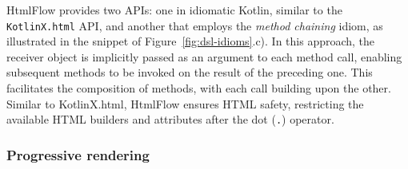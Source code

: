 HtmlFlow provides two APIs: one in idiomatic Kotlin, similar to the \texttt{KotlinX.html} 
API, and another that employs the \textit{method chaining} idiom, as illustrated 
in the snippet of Figure~\ref{fig:dsl-idioms}.c).
In this approach, the receiver object is implicitly passed as an argument to
each method call, enabling subsequent methods to be invoked on the result of the
preceding one.
This facilitates the composition of methods, with each call building upon the
other.
Similar to KotlinX.html, HtmlFlow ensures HTML safety, restricting the available
HTML builders and attributes after the dot (\texttt{.}) operator.


\subsubsection{Progressive rendering}
